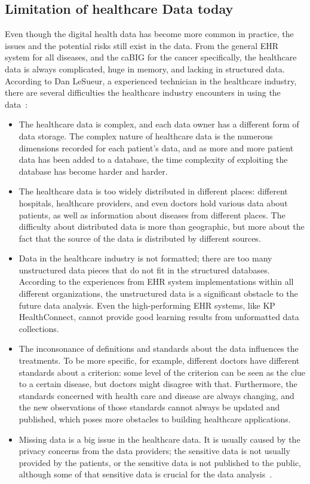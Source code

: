 \subsection{Limitation of healthcare Data today}
Even though the digital health data has become more common 
in practice, the issues and the potential risks still exist in the 
data. From the general EHR 
system for all diseases, and the caBIG for the cancer 
specifically, the healthcare data is always complicated, 
huge in memory, and lacking in
structured data. According to Dan LeSueur, a experienced technician in 
the healthcare industry, there are several difficulties the healthcare 
industry encounters in using the data~\cite{LeSueur}:
\begin{itemize}
	\item The healthcare data is complex, and each data owner has a 
	different form of data storage. The complex nature of healthcare
	 data is the numerous dimensions recorded for each patient's data, 
	 and as more and more 
	 patient data has been added to a database, the time complexity 
	 of exploiting the database has become harder and harder.
	\item The healthcare data is too widely distributed in different 
	places: different 
	hospitals, healthcare providers, and even doctors hold various 
	data about 
	patients, as well as information about diseases from different 
	places. The difficulty 
	about distributed data is more than geographic, but more 
	about the fact that the source 
	of the data is distributed by different sources.
	\item Data in the healthcare industry is not formatted; there 
	are too many 
	unstructured data pieces that do not fit in the structured 
	databases. According 
	to the experiences from EHR system implementations within all different 
	organizations, the unstructured data is a significant obstacle to the future 
	data analysis. Even the high-performing EHR systems, like KP 
	HealthConnect, cannot provide good learning results from unformatted 
	data collections.
	\item The inconsonance of definitions and standards about the data 
	influences the treatments. To be more specific, for example, different 
	doctors have different standards about a criterion: some level of the 
	criterion can be seen as the clue to a certain disease, but doctors might 
	disagree with that. Furthermore, the standards concerned with health 
	care and disease are always changing, and the new observations of 
	those standards cannot always be updated and published, which poses
	more obstacles to building healthcare applications.
	\item Missing data is a big issue in the healthcare data. It is usually 
	caused by the privacy concerns from the data providers; the 
	sensitive data is not usually provided by the patients, or the sensitive 
	data is not published to the public, although some of that sensitive data 
	is crucial for the data analysis~\cite{Ross2014}.
\end{itemize}
